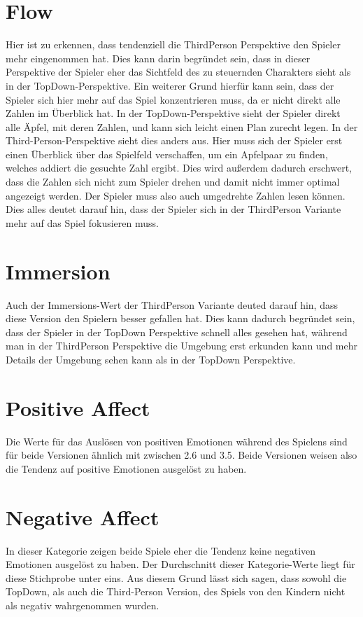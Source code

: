 \section{Flow}
\label{sec:flowDisk}
Hier ist zu erkennen, dass tendenziell die ThirdPerson Perspektive den Spieler mehr eingenommen hat. Dies kann darin begründet sein, dass in dieser Perspektive der Spieler eher das Sichtfeld des zu steuernden Charakters sieht als in der TopDown-Perspektive. Ein weiterer Grund hierfür kann sein, dass der Spieler sich hier mehr auf das Spiel konzentrieren muss, da er nicht direkt alle Zahlen im Überblick hat. In der TopDown-Perspektive sieht der Spieler direkt alle Äpfel, mit deren Zahlen, und kann sich leicht einen Plan zurecht legen. In der Third-Person-Perspektive sieht dies anders aus. Hier muss sich der Spieler erst einen Überblick über das Spielfeld verschaffen, um ein Apfelpaar zu finden, welches addiert die gesuchte Zahl ergibt. Dies wird außerdem dadurch erschwert, dass die Zahlen sich nicht zum Spieler drehen und damit nicht immer optimal angezeigt werden. Der Spieler muss also auch umgedrehte Zahlen lesen können. Dies alles deutet darauf hin, dass der Spieler sich in der ThirdPerson Variante mehr auf das Spiel fokusieren muss. 
\section{Immersion}
\label{sec:immersionDisk}
Auch der Immersions-Wert der ThirdPerson Variante deuted darauf hin, dass diese Version den Spielern besser gefallen hat. Dies kann dadurch begründet sein, dass der Spieler in der TopDown Perspektive schnell alles gesehen hat, während man in der ThirdPerson Perspektive die Umgebung erst erkunden kann und mehr Details der Umgebung sehen kann als in der TopDown Perspektive.
\section{Positive Affect} %
\label{sec:poseffDisk}
Die Werte für das Auslösen von positiven Emotionen während des Spielens sind für beide Versionen ähnlich mit zwischen 2.6 und 3.5. Beide Versionen weisen also die Tendenz auf positive Emotionen ausgelöst zu haben.
\section{Negative Affect}
\label{sec:negeffDisk}
In dieser Kategorie zeigen beide Spiele eher die Tendenz keine negativen Emotionen ausgelöst zu haben. Der Durchschnitt dieser Kategorie-Werte liegt für diese Stichprobe unter eins. Aus diesem Grund lässt sich sagen, dass sowohl die TopDown, als auch die Third-Person Version, des Spiels von den Kindern nicht als negativ wahrgenommen wurden.
